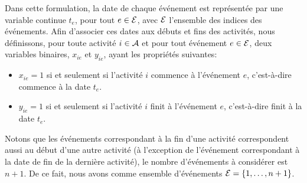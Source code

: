 Dans cette formulation, la date de chaque événement est représentée
par une variable continue $t_e$, pour tout $e \in {\cal E}$, avec
${\cal E}$ l'ensemble des indices des événements. Afin d'associer
ces dates aux débuts et fins des activités, nous définissons, pour
toute activité $i \in {\cal A}$ et pour tout événement $e \in {\cal E}$, deux
variables binaires, $x_{ie}$ et $y_{ie}$, ayant les propriétés
suivantes: 
\begin{itemize}
 \item $x_{ie}=1$ si et seulement si
l'activité $i$ commence à l'événement $e$, c'est-à-dire commence à
la date $t_e$. 
\item $y_{ie}=1$ si et seulement si l'activité $i$
finit à l'événement $e$, c'est-à-dire finit à la date $t_e$.
\end{itemize} 
Notons que les événements correspondant à la fin
d'une activité correspondent aussi au début d'une autre activité
(à l'exception de l'événement correspondant à la date de fin de la
dernière activité), le nombre d'événements à considérer est $n+1$. De
ce fait, nous avons comme ensemble d'événements ${\cal
  E}=\{1,\dots,n+1\}$. 

